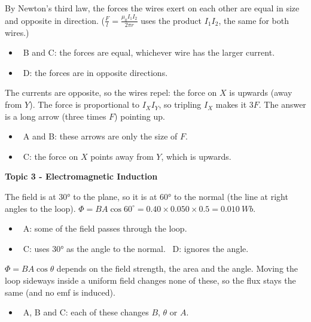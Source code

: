 \documentclass[12pt]{article}
\newcommand\anstopic[1]{\par\Needspace{8\baselineskip}\vspace{4mm}%
  \begin{center}{\headfont\bfseries\fontsize{14}{18}\selectfont #1\par}\end{center}\vspace{2pt}}
\begin{document}
\begin{practiceanswers}
\begin{practiceans}
  By Newton's third law, the forces the wires exert on each other are equal in size and opposite in
  direction. ($\frac{F}{l} = \frac{\mu_0 I_1 I_2}{2\pi r}$ uses the product $I_1 I_2$, the same for both
  wires.)
  \begin{itemize}
    \item \xmark\ B and C: the forces are equal, whichever wire has the larger current.
    \item \xmark\ D: the forces are in opposite directions.
  \end{itemize}
\end{practiceans}

\begin{practiceans}
  The currents are opposite, so the wires repel: the force on $X$ is upwards (away from $Y$). The force is
  proportional to $I_X I_Y$, so tripling $I_X$ makes it $3F$. The answer is a long arrow (three times $F$)
  pointing up.
  \begin{itemize}
    \item \xmark\ A and B: these arrows are only the size of $F$.
    \item \xmark\ C: the force on $X$ points away from $Y$, which is upwards.
  \end{itemize}
\end{practiceans}

\anstopic{Topic 3 - Electromagnetic Induction}

\begin{practiceans}
  The field is at \ang{30} to the plane, so it is at \ang{60} to the normal (the line at right angles to
  the loop). $\Phi = BA\cos 60^\circ = 0.40 \times 0.050 \times 0.5 = \qty{0.010}{Wb}$.
  \begin{itemize}
    \item \xmark\ A: some of the field passes through the loop.
    \item \xmark\ C: uses \ang{30} as the angle to the normal. \quad \xmark\ D: ignores the angle.
  \end{itemize}
\end{practiceans}

\begin{practiceans}
  $\Phi = BA\cos\theta$ depends on the field strength, the area and the angle. Moving the loop sideways
  inside a uniform field changes none of these, so the flux stays the same (and no emf is induced).
  \begin{itemize}
    \item \xmark\ A, B and C: each of these changes $B$, $\theta$ or $A$.
  \end{itemize}
\end{practiceans}


\end{practiceanswers}
\end{document}
